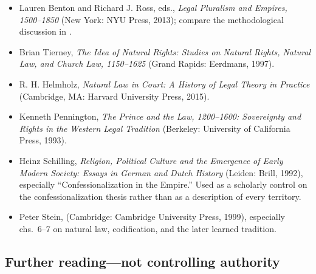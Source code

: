 \begin{itemize}
\item Lauren Benton and Richard J. Ross, eds., \emph{Legal Pluralism and Empires, 1500--1850} (New York: NYU Press, 2013); compare the methodological discussion in .
\item Brian Tierney, \emph{The Idea of Natural Rights: Studies on Natural Rights, Natural Law, and Church Law, 1150--1625} (Grand Rapids: Eerdmans, 1997).
\item R. H. Helmholz, \emph{Natural Law in Court: A History of Legal Theory in Practice} (Cambridge, MA: Harvard University Press, 2015).
\item Kenneth Pennington, \emph{The Prince and the Law, 1200--1600: Sovereignty and Rights in the Western Legal Tradition} (Berkeley: University of California Press, 1993).
\item Heinz Schilling, \emph{Religion, Political Culture and the Emergence of Early Modern Society: Essays in German and Dutch History} (Leiden: Brill, 1992), especially ``Confessionalization in the Empire.'' Used as a scholarly control on the confessionalization thesis rather than as a description of every territory.
\item Peter Stein,  (Cambridge: Cambridge University Press, 1999), especially chs.~6--7 on natural law, codification, and the later learned tradition.
\end{itemize}

\subsection{Further reading---not controlling authority}

